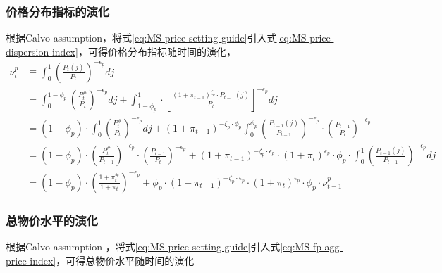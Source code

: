 \subsubsection{价格分布指标的演化}
根据Calvo assumption\citep{Calvo:1983uq}，将式\eqref{eq:MS-price-setting-guide}引入式\eqref{eq:MS-price-dispersion-index}，可得价格分布指标随时间的演化，
\begin{equation}
\label{eq:MS-price-disp-index-evolution}
\begin{split}
\nu^p_t &\equiv \int_{0}^{1} \left(\frac{P_t(j)}{P_t}\right)^{-\epsilon_p} dj \\
&= \int_0^{1-\phi_p} \left(\frac{P_t^{\#}}{P_t}\right)^{-\epsilon_p} dj
+ \int_{1-\phi_p}^{1} \cdot \left[
\frac{
  \left(1+\pi_{t-1}\right)^{\zeta_p} \cdot P_{t-1}(j)
}{
  P_t
}
\right]^{-\epsilon_p} dj \\
&= \left(1-\phi_p\right) \cdot \int_0^1 \left(\frac{P_t^{\#}}{P_t}\right)^{-\epsilon_p} dj + \left(1+\pi_{t-1}\right)^{-\zeta_p \cdot \phi_p} \int_0^{\phi_p}
\left(\frac{P_{t-1}(j)}{P_{t-1}}\right)^{-\epsilon_p} \cdot
\left(\frac{P_{t-1}}{P_t}\right)^{-\epsilon_p} \\
&= \left(1-\phi_p\right) \cdot \left(\frac{P_t^{\#}}{P_{t-1}}\right)^{-\epsilon_p} \cdot \left(\frac{P_{t-1}}{P_{t}}\right)^{-\epsilon_p}+
\left(1+\pi_{t-1}\right)^{- \zeta_p \cdot \epsilon_p} \cdot
\left(1+\pi_t\right)^{\epsilon_p} \cdot \phi_p \cdot
\int_0^1 \left(\frac{P_{t-1}(j)}{P_{t-1}}\right)^{-\epsilon_p} dj\\
&= \left(1-\phi_p\right) \cdot \left(\frac{1+\pi_{t}^{\#}}{1+\pi_t}\right)^{-\epsilon_p} + \phi_p \cdot
\left(1+\pi_{t-1}\right)^{- \zeta_p \cdot \epsilon_p} \cdot
\left(1+\pi_t\right)^{\epsilon_p} \cdot \phi_p \cdot
\nu^p_{t-1}
\end{split}
\end{equation}

\subsubsection{总物价水平的演化}
根据Calvo assumption \citep{Calvo:1983uq}，将式\eqref{eq:MS-price-setting-guide}引入式\eqref{eq:MS-fp-agg-price-index}，可得总物价水平随时间的演化


